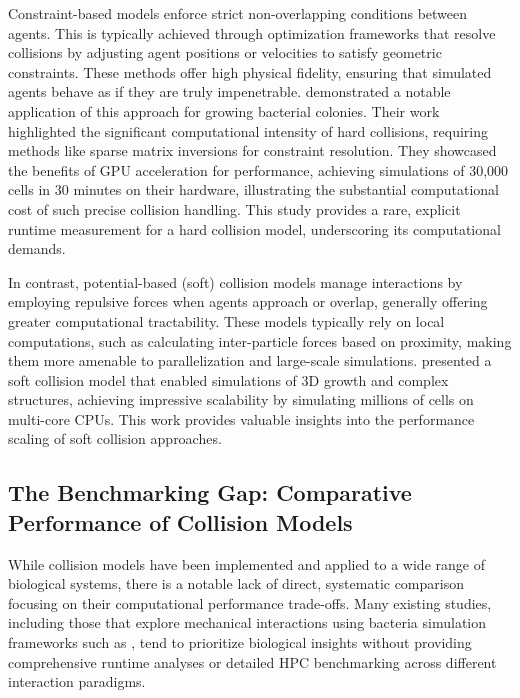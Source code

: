 \documentclass[conference]{IEEEtran}
\begin{document}
\begin{description}[style=nextline]
    \item[Constraint-Based (Hard) Collision Models]
        Constraint-based models enforce strict non-overlapping conditions between agents. This is typically achieved through optimization frameworks that resolve collisions by adjusting agent positions or velocities to satisfy geometric constraints. These methods offer high physical fidelity, ensuring that simulated agents behave as if they are truly impenetrable. \cite{Rudge2012} demonstrated a notable application of this approach for growing bacterial colonies. Their work highlighted the significant computational intensity of hard collisions, requiring methods like sparse matrix inversions for constraint resolution. They showcased the benefits of GPU acceleration for performance, achieving simulations of 30,000 cells in 30 minutes on their hardware, illustrating the substantial computational cost of such precise collision handling. This study provides a rare, explicit runtime measurement for a hard collision model, underscoring its computational demands.

    \item[Potential-Based (Soft) Collision Models]
        In contrast, potential-based (soft) collision models manage interactions by employing repulsive forces when agents approach or overlap, generally offering greater computational tractability. These models typically rely on local computations, such as calculating inter-particle forces based on proximity, making them more amenable to parallelization and large-scale simulations. \cite{Warren2019} presented a soft collision model that enabled simulations of 3D growth and complex structures, achieving impressive scalability by simulating millions of cells on multi-core CPUs. This work provides valuable insights into the performance scaling of soft collision approaches.
\end{description}

\subsection{The Benchmarking Gap: Comparative Performance of Collision Models}

While collision models have been implemented and applied to a wide range of biological systems, there is a notable lack of direct, systematic comparison focusing on their computational performance trade-offs. Many existing studies, including those that explore mechanical interactions using bacteria simulation frameworks such as \cite{Rudge2012}\cite{Weady2024}\cite{Blanchard2015}\cite{Ghosh2015}\cite{You2018}\cite{Warren2019}, tend to prioritize biological insights without providing comprehensive runtime analyses or detailed HPC benchmarking across different interaction paradigms.
\end{document}
